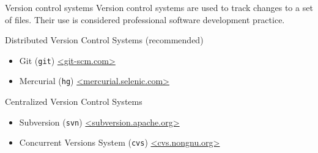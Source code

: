 \begin{block}{Version control systems}
  Version control systems are used to track changes to a set of files. Their use is considered professional software development practice.
  \begin{indented_itemize}
  \item Distributed Version Control Systems (recommended)
    \begin{itemize}
    \item Git (\texttt{git}) \url{<git-scm.com>}
    \item Mercurial (\texttt{hg}) \url{<mercurial.selenic.com>}
    \end{itemize}
  \item Centralized Version Control Systems
    \begin{itemize}
    \item Subversion (\texttt{svn}) \url{<subversion.apache.org>}
    \item Concurrent Versions System (\texttt{cvs}) \url{<cvs.nongnu.org>}
    \end{itemize}
  \end{indented_itemize}
\end{block}
